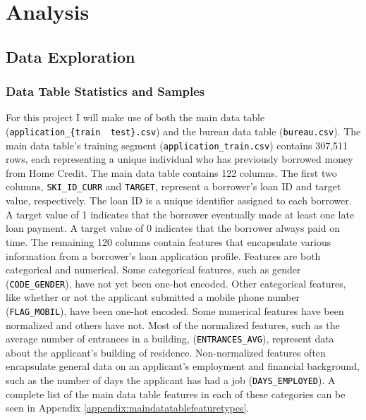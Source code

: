\documentclass[12pt, letterpaper]{article}
\begin{document}
\section{Analysis}
\subsection{Data Exploration}
\subsubsection{Data Table Statistics and Samples}
For this project I will make use of both the main data table (\colorbox{backcolor}{\textcolor{black}{\texttt{application_\{train \textbar~test\}.csv}}}) and the bureau data table (\colorbox{backcolor}{\textcolor{black}{\texttt{bureau.csv}}}). The main data table's training segment (\colorbox{backcolor}{\textcolor{black}{\texttt{application_train.csv}}}) contains 307,511 rows, each representing a unique individual who has previously borrowed money from Home Credit. The main data table contains 122 columns. The first two columns, \colorbox{backcolor}{\textcolor{black}{\texttt{SKI_ID_CURR}}} and \colorbox{backcolor}{\textcolor{black}{\texttt{TARGET}}}, represent a borrower's loan ID and target value, respectively. The loan ID is a unique identifier assigned to each borrower. A target value of 1 indicates that the borrower eventually made at least one late loan payment. A target value of 0 indicates that the borrower always paid on time. The remaining 120 columns contain features that encapsulate various information from a borrower's loan application profile. Features are both categorical and numerical. Some categorical features, such as gender (\colorbox{backcolor}{\textcolor{black}{\texttt{CODE_GENDER}}}), have not yet been one-hot encoded. Other categorical features, like whether or not the applicant submitted a mobile phone number (\colorbox{backcolor}{\textcolor{black}{\texttt{FLAG_MOBIL}}}), have been one-hot encoded. Some numerical features have been normalized and others have not. Most of the normalized features, such as the average number of entrances in a building, (\colorbox{backcolor}{\textcolor{black}{\texttt{ENTRANCES_AVG}}}), represent data about the applicant's building of residence. Non-normalized features often encapsulate general data on an applicant's employment and financial background, such as the number of days the applicant has had a job (\colorbox{backcolor}{\textcolor{black}{\texttt{DAYS_EMPLOYED}}}). A complete list of the main data table features in each of these categories can be seen in Appendix \ref{appendix:maindatatablefeaturetypes}.
\end{document}
